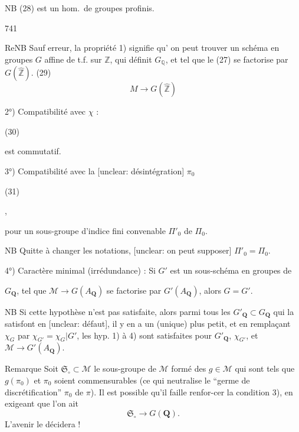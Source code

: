 NB (28) est un hom.\ de groupes profinis.

\newpage


741

ReNB Sauf erreur, la propriété 1) signifie qu'
on peut trouver un schéma en groupes $G$
affine de t.f. sur $\mathbb{Z}$, qui définit $G_\mathbb{Q}$, et
tel que le (27) se factorise par $G(\hat{\mathbb{Z}})$.
(29) $$M \longrightarrow G(\hat{\mathbb{Z}})$$

2°) Compatibilité avec $\chi$ :

(30)

est commutatif.

3°) Compatibilité avec la [unclear: désintégration] $\pi_0$

(31)
,

pour un sous-groupe d'indice fini
convenable $\Pi'_0$ de $\Pi_0$.

NB Quitte à changer les notations, [unclear: on peut supposer] $\Pi'_0 = \Pi_0$.

4°) Caractère minimal (irrédundance) :
Si $G'$ est un sous-schéma en groupes de

\newpage


$G_{\mathbf{Q}}$, tel que $\mathcal{M} \to G(A_{\mathbf{Q}})$ se
factorise par $G'(A_{\mathbf{Q}})$, alors $G = G'$.

NB Si cette hypothèse n'est pas satisfaite,
alors parmi tous les $G'_{\mathbf{Q}} \subset G_{\mathbf{Q}}$ qui la
satisfont en [unclear: défaut], il y en a un
(unique) plus petit, et en remplaçant $\chi_G$
par $\chi_{G'} = \chi_G | G'$, les hyp.
1) à 4) sont satisfaites pour $G'_{\mathbf{Q}}$, $\chi_{G'}$,
et $\mathcal{M} \to G'(A_{\mathbf{Q}})$.

Remarque  Soit $\mathfrak{S}_\circ \subset \mathcal{M}$ le
sous-groupe de $\mathcal{M}$ formé des $g \in \mathcal{M}$ qui
sont tels que $g(\pi_0)$ et $\pi_0$ soient
commensurables (ce qui neutralise
le ``germe de discrétification'' $\pi_0$ de $\pi$).
Il est possible qu'il faille renfor-cer
la condition 3), en exigeant que
l'on ait
$$ \mathfrak{S}_\circ \to G(\mathbf{Q}). $$
L'avenir le décidera !

